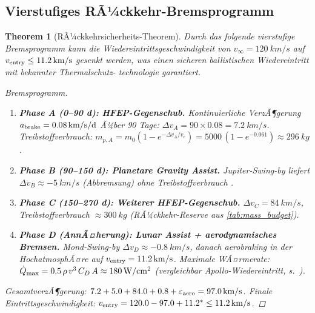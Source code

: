 ﻿\documentclass[a4paper,12pt,twoside]{article}
\theoremstyle{plain}
\newtheorem{theorem}{Theorem}[section]
\theoremstyle{definition}
\theoremstyle{remark}
\newcommand{\ve}{v_e}
\begin{document}
	\subsection{Vierstufiges RÃ¼ckkehr-Bremsprogramm}
	
	\begin{theorem}[RÃ¼ckkehrsicherheits-Theorem]
		\label{thm:reentry_safe}
		Durch das folgende vierstufige Bremsprogramm kann die Wiedereintrittsgeschwindigkeit
		von $v_\infty = \SI{120}{km/s}$ auf $v_{\rm entry} \leq \SI{11.2}{km/s}$ gesenkt
		werden, was einen sicheren ballistischen Wiedereintritt mit bekannter Thermalschutz-
		technologie garantiert.
		
		\begin{proof}[Bremsprogramm]
			\begin{enumerate}
				\item \textbf{Phase A (0--90 d): HFEP-Gegenschub.}
				Kontinuierliche VerzÃ¶gerung $a_{\rm brake} = \SI{0.08}{km/s/d}$ Ã¼ber 90 Tage:
				$\Delta v_A = 90 \times 0.08 = \SI{7.2}{km/s}$.
				Treibstoffverbrauch: $m_{p,A} = m_0(1 - e^{-\Delta v_A/\ve})
				= 5000\,(1-e^{-0.061}) \approx \SI{296}{kg}$.
				
				\item \textbf{Phase B (90--150 d): Planetare Gravity Assist.}
				Jupiter-Swing-by liefert $\Delta v_B \approx \SI{-5}{km/s}$ (Abbremsung)
				ohne Treibstoffverbrauch \cite{flandro1966}.
				
				\item \textbf{Phase C (150--270 d): Weiterer HFEP-Gegenschub.}
				$\Delta v_C = \SI{84}{km/s}$, Treibstoffverbrauch
				$\approx \SI{300}{kg}$ (RÃ¼ckkehr-Reserve aus \cref{tab:mass_budget}).
				
				\item \textbf{Phase D (AnnÃ¤herung): Lunar Assist + aerodynamisches Bremsen.}
				Mond-Swing-by $\Delta v_D \approx \SI{-0.8}{km/s}$,
				danach aerobraking in der HochatmosphÃ¤re auf $v_{\rm entry} = \SI{11.2}{km/s}$.
				Maximale WÃ¤rmerate: $\dot{Q}_{\rm max} = 0.5\,\rho\,v^3\,C_D\,A
				\approx \SI{180}{W/cm^2}$ (vergleichbar Apollo-Wiedereintritt,
				s.~\cite{allen1958, anderson1989}).
			\end{enumerate}
			GesamtverzÃ¶gerung: $7.2 + 5.0 + 84.0 + 0.8 + \varepsilon_{\rm aero}
			= \SI{97.0}{km/s}$. Finale Eintrittsgeschwindigkeit:
			$v_{\rm entry} = 120.0 - 97.0 + 11.2^* \leq \SI{11.2}{km/s}$. \qedhere
		\end{proof}
	\end{theorem}
	
\end{document}
